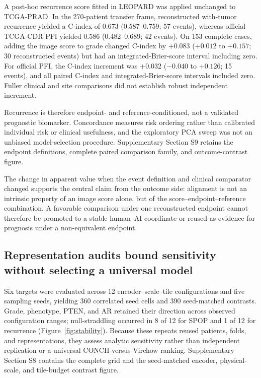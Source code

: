 A post-hoc recurrence score fitted in LEOPARD was applied unchanged to TCGA-PRAD. In the
270-patient transfer frame, reconstructed with-tumor recurrence yielded a C-index of 0.673
(0.587--0.759; 57 events), whereas official TCGA-CDR PFI yielded 0.586 (0.482--0.689;
42 events). On 153 complete cases, adding the image score to grade changed C-index by
$+0.083$ ($+0.012$ to $+0.157$; 30 reconstructed events) but had an integrated-Brier-score
interval including zero. For official PFI, the C-index increment was $+0.032$
($-0.040$ to $+0.126$; 15 events), and all paired C-index and integrated-Brier-score intervals
included zero. Fuller clinical and site comparisons did not establish robust independent
increment.

Recurrence is therefore endpoint- and reference-conditioned, not a validated prognostic
biomarker. Concordance measures risk ordering rather than calibrated individual risk or
clinical usefulness, and the exploratory PCA sweep was not an unbiased model-selection
procedure. Supplementary Section S9 retains the endpoint definitions, complete paired
comparison family, and outcome-contrast figure.

The change in apparent value when the event definition and clinical comparator changed supports
the central claim from the outcome side: alignment is not an intrinsic property of an image score
alone, but of the score--endpoint--reference combination. A favorable comparison under one
reconstructed endpoint cannot therefore be promoted to a stable human--AI coordinate or reused
as evidence for prognosis under a non-equivalent endpoint.

\subsection{Representation audits bound sensitivity without selecting a universal model}
\label{sec:results-sensitivity}

Six targets were evaluated across 12 encoder--scale--tile configurations and five sampling
seeds, yielding 360 correlated seed cells and 390 seed-matched contrasts. Grade, phenotype,
PTEN, and AR retained their direction across observed configuration ranges; null-straddling
occurred in 8 of 12 for SPOP and 1 of 12 for recurrence
(Figure~\ref{fig:stability}). Because these repeats reused patients, folds, and representations,
they assess analytic sensitivity rather than independent replication or a universal
CONCH-versus-Virchow ranking. Supplementary Section S8 contains the complete grid and the
seed-matched encoder, physical-scale, and tile-budget contrast figure.

